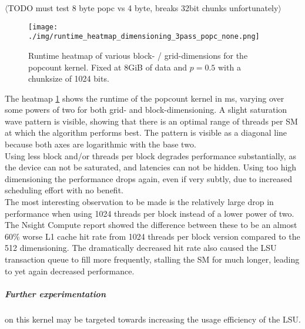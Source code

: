 \documentclass{tudscrreprt}
\newcommand{\markr}[1]{\textcolor{review}{$\langle$#1$\rangle$}}
\begin{document}
			\markr{TODO must test 8 byte popc vs 4 byte, breaks 32bit chunks unfortunately}\\
			
			\begin{figure}[!ht]
				\centering
				\texttt{[image: ./img/runtime\_heatmap\_dimensioning\_3pass\_popc\_none.png]}
				\caption{\label{fig:runtime_heatmap_dimensioning_3pass_popc_none}Runtime heatmap of various block- / grid-dimensions for the popcount kernel. Fixed at 8GiB of data and $p=0.5$ with a chunksize of 1024 bits.}
			\end{figure}
			
			The heatmap \ref{fig:runtime_heatmap_dimensioning_3pass_popc_none} shows the runtime of the popcount kernel in ms, varying over some powers of two for both grid- and block-dimensioning. A slight saturation wave pattern is visible, showing that there is an optimal range of threads per SM at which the algorithm performs best. The pattern is visible as a diagonal line because both axes are logarithmic with the base two. \\
			Using less block and/or threads per block degrades performance substantially, as the device can not be saturated, and latencies can not be hidden. Using too high dimensioning the performance drops again, even if very subtly, due to increased scheduling effort with no benefit. \\
			The most interesting observation to be made is the relatively large drop in performance when using 1024 threads per block instead of a lower power of two. The Nsight Compute report showed the difference between these to be an almost 60\% worse L1 cache hit rate from 1024 threads per block version compared to the 512 dimensioning. The dramatically decreased hit rate also caused the LSU transaction queue to fill more frequently, stalling the SM for much longer, leading to yet again decreased performance. \\
			
			\subparagraph{Further experimentation} on this kernel may be targeted towards increasing the usage efficiency of the LSU. \\
			
\end{document}
